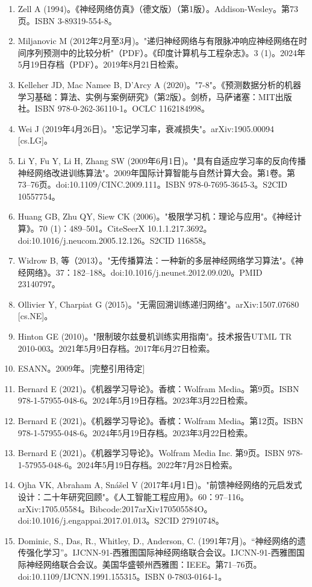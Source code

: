 \begin{enumerate}
\item Zell A (1994)。《神经网络仿真》（德文版）（第1版）。Addison-Wesley。第73页。ISBN 3-89319-554-8。
\item Miljanovic M (2012年2月至3月)。"递归神经网络与有限脉冲响应神经网络在时间序列预测中的比较分析"（PDF）。《印度计算机与工程杂志》。3 (1)。2024年5月19日存档（PDF）。2019年8月21日检索。
\item Kelleher JD, Mac Namee B, D'Arcy A (2020)。"7-8"。《预测数据分析的机器学习基础：算法、实例与案例研究》（第2版）。剑桥，马萨诸塞：MIT出版社。ISBN 978-0-262-36110-1。OCLC 1162184998。
\item Wei J (2019年4月26日)。"忘记学习率，衰减损失"。arXiv:1905.00094 [cs.LG]。
\item Li Y, Fu Y, Li H, Zhang SW (2009年6月1日)。"具有自适应学习率的反向传播神经网络改进训练算法"。2009年国际计算智能与自然计算大会。第1卷。第73–76页。doi:10.1109/CINC.2009.111。ISBN 978-0-7695-3645-3。S2CID 10557754。
\item Huang GB, Zhu QY, Siew CK (2006)。"极限学习机：理论与应用"。《神经计算》。70 (1)：489–501。CiteSeerX 10.1.1.217.3692。doi:10.1016/j.neucom.2005.12.126。S2CID 116858。
\item Widrow B, 等（2013）。"无传播算法：一种新的多层神经网络学习算法"。《神经网络》。37：182–188。doi:10.1016/j.neunet.2012.09.020。PMID 23140797。
\item Ollivier Y, Charpiat G (2015)。"无需回溯训练递归网络"。arXiv:1507.07680 [cs.NE]。
\item Hinton GE (2010)。"限制玻尔兹曼机训练实用指南"。技术报告UTML TR 2010-003。2021年5月9日存档。2017年6月27日检索。
\item ESANN。2009年。[完整引用待定]
\item Bernard E (2021)。《机器学习导论》。香槟：Wolfram Media。第9页。ISBN 978-1-57955-048-6。2024年5月19日存档。2023年3月22日检索。
\item Bernard E (2021)。《机器学习导论》。香槟：Wolfram Media。第12页。ISBN 978-1-57955-048-6。2024年5月19日存档。2023年3月22日检索。
\item Bernard E (2021)。《机器学习导论》。Wolfram Media Inc. 第9页。ISBN 978-1-57955-048-6。2024年5月19日存档。2022年7月28日检索。
\item Ojha VK, Abraham A, Snášel V (2017年4月1日)。"前馈神经网络的元启发式设计：二十年研究回顾"。《人工智能工程应用》。60：97–116。arXiv:1705.05584。Bibcode:2017arXiv170505584O。doi:10.1016/j.engappai.2017.01.013。S2CID 27910748。
\item Dominic, S., Das, R., Whitley, D., Anderson, C. (1991年7月)。“神经网络的遗传强化学习”。IJCNN-91-西雅图国际神经网络联合会议。IJCNN-91-西雅图国际神经网络联合会议。美国华盛顿州西雅图：IEEE。第71–76页。doi:10.1109/IJCNN.1991.155315。ISBN 0-7803-0164-1。

\end{enumerate}
